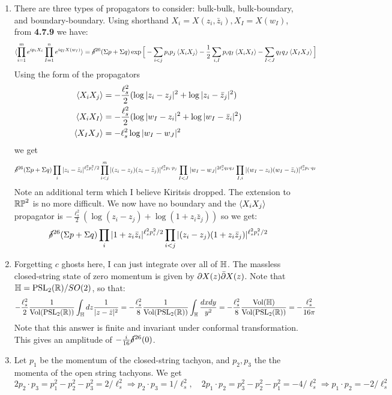 \documentclass[11pt, class=article, crop=false]{standalone}
\begin{document}
\begin{enumerate}
	\item There are three types of propagators to consider: bulk-bulk, bulk-boundary, and boundary-boundary. Using shorthand $X_i = X(z_i, \bar z_i), X_I = X(w_I)$, from \textbf{4.7.9} we have:
	\[
	\begin{aligned}
		\braket{\prod_{i=1}^m e^{i p_i X_i} \prod_{I=1}^n e^{i q_I X(w_I)}} &= \cancel\delta^{26} (\Sigma p + \Sigma q) \exp\Big[- \sum_{i<j} p_i p_j \braket{X_i X_j} - \frac12 \sum_{i, I} p_i q_I \braket{X_i X_I} - \sum_{I<J} q_I q_J \braket{X_I X_J} \Big]\\
	\end{aligned}
	\]
	Using the form of the propagators 
	\[
		\begin{aligned}
			\braket{X_i X_j} &= -\frac{\ell_s^2}{2} (\log |z_i - z_j|^2 + \log |z_i - \bar z_j|^2 )\\
			\braket{X_i X_I} &=  -\frac{\ell_s^2}{2} (\log |w_I-z_i|^2 + \log |w_I-\bar z_i|^2)\\
			\braket{X_I X_J} &= -\ell_s^2 \log|w_I-w_J|^2
		\end{aligned}
	\]
	we get
	\[
		\cancel\delta^{26} (\Sigma p + \Sigma q) \prod_{i} |z_i - \bar z_i|^{\ell_s^2 p_i^2/2} \prod_{i<j}^m |(z_i - z_j) (z_i - \bar z_j)|^{\ell_s^2 p_i \cdot p_j} \prod_{I<J} |w_I - w_J|^{2 \ell_s^2 q_I q_J} \prod_{I, i} |(w_I - z_i) (w_I- \bar z_i)|^{\ell_s^2 p_i \cdot q_I}
	\]
	Note an additional term which I believe Kiritsis dropped. The extension to $\mathbb{RP}^2$ is no more difficult. We now have no boundary and the $\braket{X_i X_j}$ propagator is $-\frac{\ell_s^2}{2} (\log(z_i - z_j) + \log(1+z_i \bar z_j))$ so we get:
	\[
		\cancel\delta^{26} (\Sigma p + \Sigma q) \prod_{i} |1 + z_i \bar z_i|^{\ell_s^2 p_i^2/2} \prod_{i < j} |(z_i - z_j) (1 + z_i \bar z_j)|^{\ell_s^2 p_i^2/2}
	\]
	
	\item Forgetting $c$ ghosts here, I can just integrate over all of $\mathbb{H}$. The massless closed-string state of zero momentum is given by $\partial X(z) \bar {\partial} X(z)$. Note that $\mathbb{H} = \mathrm{PSL}_2(\mathbb{R}) / SO(2)$, so that:
	\[
		-\frac{\ell_s^2}{2} \frac{1}{\mathrm{Vol}(\mathrm{PSL}_2(\mathbb{R}))} \int_{\mathbb{H}} dz \frac{1}{|z - \bar z|^2}
		 = -\frac{\ell_s^2}{8} \frac{1}{\mathrm{Vol}(\mathrm{PSL}_2(\mathbb{R}))} \int_{\mathbb{H}} \frac{dx dy}{y^2} = -\frac{\ell_s^2}{8} \frac{\mathrm{Vol}(\mathbb{H})}{\mathrm{Vol}(\mathrm{PSL}_2(\mathbb{R}))} = -\frac{\ell_s^2}{16\pi}
	\]
	 Note that this answer is finite and invariant under conformal transformation. This gives an amplitude of $-\frac{i}{16} \cancel\delta^{26}(0)$. 
	
	\item Let $p_1$ be the momentum of the closed-string tachyon, and $p_2, p_3$ the the momenta of the open string tachyons. We get $2 p_2 \cdot p_3 = p_1^2 - p_2^2 - p_3^2 = 2/\ell_s^2 \Rightarrow p_2 \cdot p_3 = 1/\ell_s^2, \quad 2 p_1 \cdot p_2 = p_3^2 - p_2^2 - p_1^2  = -4/\ell_s^2 \Rightarrow p_1 \cdot p_2 = -2/\ell_s^2$
	

\end{enumerate}
\end{document}

